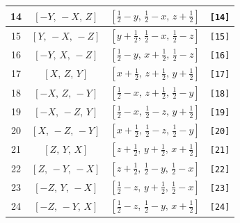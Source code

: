 \documentclass[fleqn,8pt]{jsarticle}
\begin{document}
\begin{longtable}{cccc}
14 & $\left[ - Y,\, - X,\, Z \right]$ & $\left[ \frac{1}{2} - y,\, \frac{1}{2} - x,\, z + \frac{1}{2} \right]$ & {\tt [14]} \\ \hline
15 & $\left[ Y,\, - X,\, - Z \right]$ & $\left[ y + \frac{1}{2},\, \frac{1}{2} - x,\, \frac{1}{2} - z \right]$ & {\tt [15]} \\ \hline
16 & $\left[ - Y,\, X,\, - Z \right]$ & $\left[ \frac{1}{2} - y,\, x + \frac{1}{2},\, \frac{1}{2} - z \right]$ & {\tt [16]} \\ \hline
17 & $\left[ X,\, Z,\, Y \right]$ & $\left[ x + \frac{1}{2},\, z + \frac{1}{2},\, y + \frac{1}{2} \right]$ & {\tt [17]} \\ \hline
18 & $\left[ - X,\, Z,\, - Y \right]$ & $\left[ \frac{1}{2} - x,\, z + \frac{1}{2},\, \frac{1}{2} - y \right]$ & {\tt [18]} \\ \hline
19 & $\left[ - X,\, - Z,\, Y \right]$ & $\left[ \frac{1}{2} - x,\, \frac{1}{2} - z,\, y + \frac{1}{2} \right]$ & {\tt [19]} \\ \hline
20 & $\left[ X,\, - Z,\, - Y \right]$ & $\left[ x + \frac{1}{2},\, \frac{1}{2} - z,\, \frac{1}{2} - y \right]$ & {\tt [20]} \\ \hline
21 & $\left[ Z,\, Y,\, X \right]$ & $\left[ z + \frac{1}{2},\, y + \frac{1}{2},\, x + \frac{1}{2} \right]$ & {\tt [21]} \\ \hline
22 & $\left[ Z,\, - Y,\, - X \right]$ & $\left[ z + \frac{1}{2},\, \frac{1}{2} - y,\, \frac{1}{2} - x \right]$ & {\tt [22]} \\ \hline
23 & $\left[ - Z,\, Y,\, - X \right]$ & $\left[ \frac{1}{2} - z,\, y + \frac{1}{2},\, \frac{1}{2} - x \right]$ & {\tt [23]} \\ \hline
24 & $\left[ - Z,\, - Y,\, X \right]$ & $\left[ \frac{1}{2} - z,\, \frac{1}{2} - y,\, x + \frac{1}{2} \right]$ & {\tt [24]} \\
\end{longtable}
\end{document}

